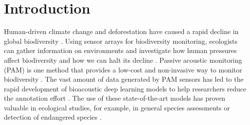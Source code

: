 \section{Introduction}
\label{sec:introcution}

Human-driven climate change and deforestation have caused a rapid decline in global biodiversity \cite{gosselin_relationships_2018}.
Using sensor arrays for biodiversity monitoring, ecologists can gather information on environments and investigate how human pressures affect biodiversity and how we can halt its decline \cite{schmeller_building_2017}.
Passive acoustic monitoring (PAM) is one method that provides a low-cost and non-invasive way to monitor biodiversity \cite{sugai_terrestrial_2019}.
The vast amount of data generated by PAM sensors has led to the rapid development of bioacoustic deep learning models to help researchers reduce the annotation effort \cite{stowell_computational_2022}.
The use of these state-of-the-art models has proven valuable in ecological studies, for example, in general species assessments \cite{cowans_improving_2024} or detection of endangered species \cite{allen-ankins_use_2025}.

